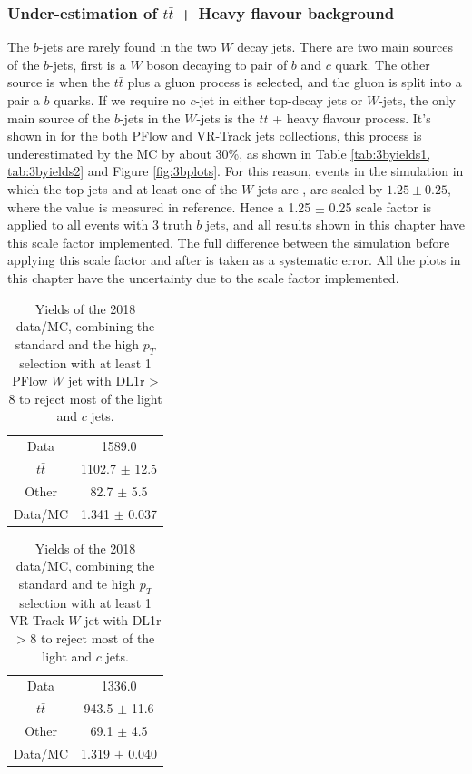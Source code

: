\documentclass[letterpaper,12pt]{article}
\begin{document}
\subsubsection{Under-estimation of $t\bar{t}$ + Heavy flavour background }
The $b$-jets are rarely found in the two $W$ decay jets. There are two main sources of 
the $b$-jets, first is a $W$ boson decaying to pair of $b$ and $c$ quark. The other 
source is when the $t\bar{t}$ plus a gluon process is selected, and the gluon is split 
into a pair a $b$ quarks. If we require no $c$-jet in either top-decay jets or $W$-jets, 
the only main source of the $b$-jets in the $W$-jets is the $t\bar{t}$ + heavy flavour 
process. It's shown in for the both PFlow and VR-Track jets collections, this process is 
underestimated by the MC by about 30\%, as shown in Table \ref{tab:3byields1, tab:3byields2} 
and Figure \ref{fig:3bplots}. For this reason, events in the simulation
in which the top-jets and at least one of the $W$-jets are \bjets, are
scaled by $1.25 \pm 0.25$, where the value is measured in reference\cite{TOPQ-2017-12}.
Hence a 1.25 $\pm$ 0.25 scale factor is applied to all events with 3 truth $b$ jets, 
and all results shown in this chapter have this scale factor implemented. 
The full difference between the simulation before applying this scale factor and 
after is taken as a systematic error. All the plots in this chapter have the 
uncertainty due to the scale factor implemented. 




\begin{table}[]
    \centering
    \begin{tabular}{c|c}
        Data & 1589.0 \\
         $t\bar{t}$ & 1102.7 $\pm$ 12.5 \\
         Other & 82.7 $\pm$ 5.5 \\
         Data/MC & 1.341 $\pm$ 0.037 \\
    \end{tabular}
	\caption{Yields of the 2018 data/MC, combining the standard and the 
	high $p_T$ selection with at least 1 PFlow $W$ jet with DL1r > 8 to 
	reject most of the light and $c$ jets.}
    \label{tab:3byields1}
\end{table}

\begin{table}[]
    \centering
    \begin{tabular}{c|c}
        Data & 1336.0 \\
         $t\bar{t}$ & 943.5 $\pm$ 11.6 \\
         Other & 69.1 $\pm$ 4.5 \\
         Data/MC & 1.319 $\pm$ 0.040 \\
    \end{tabular}
	\caption{Yields of the 2018 data/MC, combining the standard 
	and te high $p_T$ selection with at least 1 VR-Track $W$ jet with 
	DL1r > 8 to reject most of the light and $c$ jets.}
    \label{tab:3byields2}
\end{table}
\end{document}
